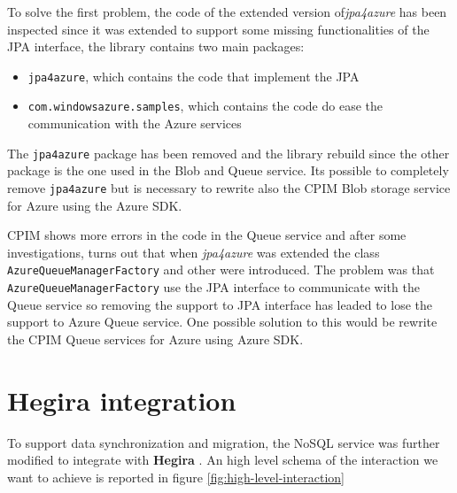 \noindent To solve the first problem, the code of the extended version of\textit{jpa4azure} has been inspected since it was extended to support some missing functionalities of the JPA interface, the library contains two main packages:
\begin{itemize}
\item \texttt{jpa4azure}, which contains the code that implement the JPA
\item \texttt{com.windowsazure.samples}, which contains the code do ease the communication with the Azure services
\end{itemize}
The \texttt{jpa4azure} package has been removed and the library rebuild since the other package is the one used in the Blob and Queue service. Its possible to completely remove \texttt{jpa4azure} but is necessary to rewrite also the CPIM Blob storage service for Azure using the Azure SDK.

\newparagraph CPIM shows more errors in the code in the Queue service and after some investigations, turns out that when \textit{jpa4azure} was extended the class \texttt{AzureQueueManagerFactory} and other were introduced.
The problem was that \texttt{AzureQueueManagerFactory} use the JPA interface to communicate with the Queue service so removing the support to JPA interface has leaded to lose the support to Azure Queue service.
One possible solution to this would be rewrite the CPIM Queue services for Azure using Azure SDK.

\section{Hegira integration}
\label{sec:hegira}
To support data synchronization and migration, the NoSQL service was further modified to integrate with \textbf{Hegira} \cite{thesis:marco}. An high level schema of the interaction we want to achieve is reported in figure \ref{fig:high-level-interaction}

